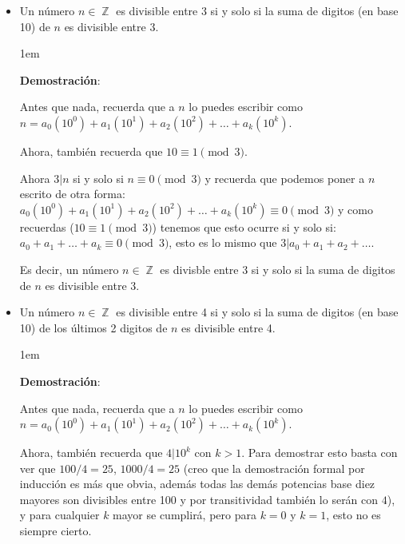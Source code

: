 \documentclass[12pt, fleqn]{report}                             %
\newenvironment{SmallIndentation}[1][0.75em]                    %
    {\begin{adjustwidth}{#1}{}\begin{footnotesize}}                 %
    {\end{footnotesize}\end{adjustwidth}}                           %
\DeclareMathOperator \Integers  {\mathbb{Z}}                     %
\begin{document}
            \begin{itemize}

                \item Un número $n \in \Integers$ es divisible entre 3 si y solo si
                    la suma de digitos (en base 10) de $n$ es divisible entre 3.

                    \begin{SmallIndentation}[1em]
                        \textbf{Demostración}:

                        Antes que nada, recuerda que a $n$ lo puedes escribir como
                        $n = a_0(10^0) + a_1(10^1) + a_2(10^2) + \dots + a_k(10^k)$.

                        Ahora, también recuerda que $10 \equiv 1 \pmod{3}$.

                        Ahora $3|n$ si y solo si $n \equiv 0 \pmod{3}$ y recuerda
                        que podemos poner a $n$ escrito de otra forma:
                        $a_0(10^0) + a_1(10^1) + a_2(10^2) + \dots + a_k(10^k) \equiv 0 \pmod{3}$
                        y como recuerdas ($10 \equiv 1 \pmod{3}$) tenemos que esto ocurre
                        si y solo si:  $a_0 + a_1 +\dots +a_k \equiv 0 \pmod{3}$, esto es lo mismo que
                        $3|a_0+a_1+a_2+\dots$.

                        Es decir, un número $n \in \Integers$ es divisble entre 3 si y solo si
                        la suma de digitos de $n$ es divisible entre 3.

                    \end{SmallIndentation}

                \item Un número $n \in \Integers$ es divisible entre 4 si y solo si
                    la suma de digitos (en base 10) de los últimos 2 digitos de $n$ es divisible
                    entre 4.

                    \begin{SmallIndentation}[1em]
                        \textbf{Demostración}:

                        Antes que nada, recuerda que a $n$ lo puedes escribir como
                        $n = a_0(10^0) + a_1(10^1) + a_2(10^2) + \dots + a_k(10^k)$.

                        Ahora, también recuerda que $4 |10^k$ con $k>1$.
                        Para demostrar esto basta con ver que $100/4 = 25$, 
                        $1000/4 = 25$ (creo que la demostración formal por inducción
                        es más que obvia, además todas las demás potencias base diez mayores son
                        divisibles entre 100 y por transitividad también lo serán con $4$), y para
                        cualquier $k$ mayor se cumplirá, pero para $k=0$ y $k=1$, esto no es siempre cierto.


\end{SmallIndentation}
\end{itemize}
\end{document}
